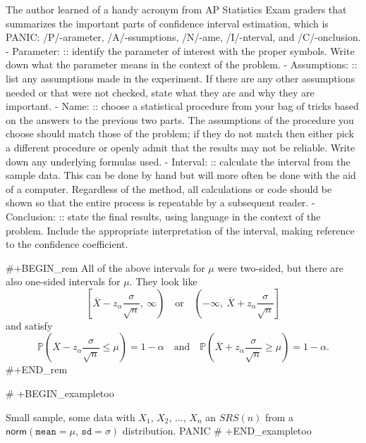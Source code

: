 The author learned of a handy acronym from AP Statistics Exam graders
that summarizes the important parts of confidence interval estimation,
which is PANIC: /P/-arameter, /A/-ssumptions, /N/-ame, /I/-nterval,
and /C/-onclusion.
- Parameter: :: identify the parameter of interest with the proper
                symbols. Write down what the parameter means in the
                context of the problem.
- Assumptions: :: list any assumptions made in the experiment. If
                  there are any other assumptions needed or that were
                  not checked, state what they are and why they are
                  important.
- Name: :: choose a statistical procedure from your bag of tricks
           based on the answers to the previous two parts. The
           assumptions of the procedure you choose should match those
           of the problem; if they do not match then either pick a
           different procedure or openly admit that the results may
           not be reliable. Write down any underlying formulas used.
- Interval: :: calculate the interval from the sample data. This can
               be done by hand but will more often be done with the
               aid of a computer. Regardless of the method, all
               calculations or code should be shown so that the entire
               process is repeatable by a subsequent reader.
- Conclusion: :: state the final results, using language in the
                 context of the problem. Include the appropriate
                 interpretation of the interval, making reference to
                 the confidence coefficient.

#+BEGIN_rem
All of the above intervals for \(\mu\) were two-sided, but there are
also one-sided intervals for \(\mu\). They look like
\begin{equation}
\left[\overline{X}-z_{\alpha}\frac{\sigma}{\sqrt{n}},\ \infty\right)\quad \mbox{or}\quad \left(-\infty,\ \overline{X}+z_{\alpha}\frac{\sigma}{\sqrt{n}}\right]
\end{equation}
and satisfy
\begin{equation}
\mathbb{P}\left(\overline{X}-z_{\alpha}\frac{\sigma}{\sqrt{n}}\leq\mu\right)=1-\alpha\quad \mbox{and}\quad \mathbb{P}\left(\overline{X}+z_{\alpha}\frac{\sigma}{\sqrt{n}}\geq\mu\right)=1-\alpha.
\end{equation}
#+END_rem


# +BEGIN_exampletoo

Small sample, some data with \(X_{1}\), \(X_{2}\), ..., \(X_{n}\) an
\(SRS(n)\) from a
\(\mathsf{norm}(\mathtt{mean}=\mu,\,\mathtt{sd}=\sigma)\)
distribution.  PANIC
# +END_exampletoo
 
